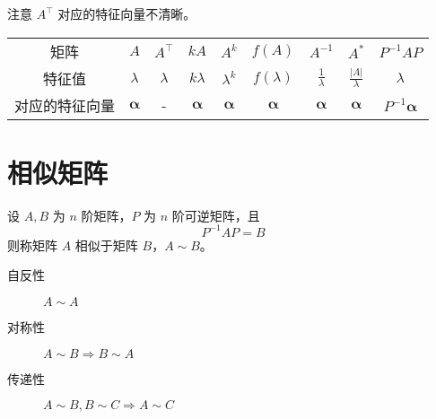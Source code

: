 \documentclass{ctexbook}
\begin{document}
\begin{proposition}[矩阵操作后的特征值]
    注意 $A^\top$ 对应的特征向量不清晰。

    \begin{tabular}{ccccccccc}
        矩阵 & $A$ & $A^\top$ & $kA$ & $A^k$ & $f(A)$ & $A^{-1}$ & $A^*$ & $P^{-1}AP$ \\
        特征值 & $\lambda$ & $\lambda$ & $k\lambda$ & $\lambda^k$ & $f(\lambda)$ & $\frac{1}{\lambda}$ & $\frac{|A|}{\lambda}$ & $\lambda$ \\
        对应的特征向量 & $\boldsymbol{\alpha}$ & - & $\boldsymbol{\alpha}$ & $\boldsymbol{\alpha}$ & $\boldsymbol{\alpha}$ & $\boldsymbol{\alpha}$ & $\boldsymbol{\alpha}$ & $P^{-1}\boldsymbol{\alpha}$
    \end{tabular}
\end{proposition}

\section{相似矩阵}

\begin{definition}[相似矩阵]
    设 $A,B$ 为 $n$ 阶矩阵，$P$ 为 $n$ 阶可逆矩阵，且
    \begin{equation}
        P^{-1}AP=B
    \end{equation}
    则称矩阵 $A$ 相似于矩阵 $B$，$A\sim B$。
\end{definition}

\begin{proposition}[相似的性质]
    \begin{description}
        \item[自反性] $A\sim A$
        \item[对称性] $A\sim B\Rightarrow B\sim A$
        \item[传递性] $A\sim B, B\sim C\Rightarrow A\sim C$  
    \end{description}
\end{proposition}
\end{document}
